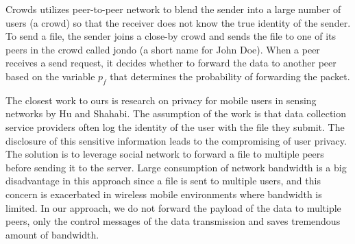 Crowds\cite{DBLP:journals/cacm/ReiterR99} utilizes peer-to-peer network
to blend the sender into a large number of users (a crowd) so that the
receiver does not know the true identity of the sender.
To send a file, the sender joins a close-by crowd and sends the file to
one of its peers in the crowd called jondo (a short name for John Doe).
When a peer receives a send request, it decides whether to forward the
data to another peer based on the variable $p_f$ that determines the
probability of forwarding the packet.

The closest work to ours is research on privacy for mobile users in sensing
networks \cite{DBLP:conf/percom/HuS10} by Hu and Shahabi. The assumption of the
work is that data collection service providers often log the identity of the
user with the file they submit. The disclosure of this sensitive information
leads to the compromising of user privacy. The solution is to leverage
social network to forward a file to multiple peers before sending it to
the server. Large consumption of network bandwidth is a big disadvantage in
this approach since a file is sent to multiple users, and this concern is
exacerbated in wireless mobile environments where bandwidth is limited.
In our approach, we do not forward the payload of the data to multiple peers,
only the control messages of the data transmission and saves tremendous amount
of bandwidth. 
